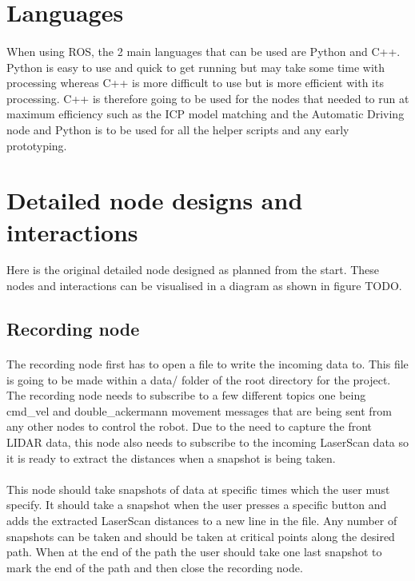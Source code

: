 \section{Languages}
\paragraph{}
When using ROS, the 2 main languages that can be used are Python and C++. Python is easy to use and quick to get running but may take some time with processing whereas C++ is more difficult to use but is more efficient with its processing. C++ is therefore going to be used for the nodes that needed to run at maximum efficiency such as the ICP model matching and the Automatic Driving node and Python is to be used for all the helper scripts and any early prototyping.

\section{Detailed node designs and interactions}
Here is the original detailed node designed as planned from the start. These nodes and interactions can be visualised in a diagram as shown in figure TODO.
\subsection{Recording node}
\paragraph{}
The recording node first has to open a file to write the incoming data to. This file is going to be made within a data/ folder of the root directory for the project. The recording node needs to subscribe to a few different topics one being cmd\_vel and double\_ackermann movement messages that are being sent from any other nodes to control the robot. Due to the need to capture the front LIDAR data, this node also needs to subscribe to the incoming LaserScan data so it is ready to extract the distances when a snapshot is being taken.
\paragraph{}
This node should take snapshots of data at specific times which the user must specify. It should take a snapshot when the user presses a specific button and adds the extracted LaserScan distances to a new line in the file. Any number of snapshots can be taken and should be taken at critical points along the desired path. When at the end of the path the user should take one last snapshot to mark the end of the path and then close the recording node.
